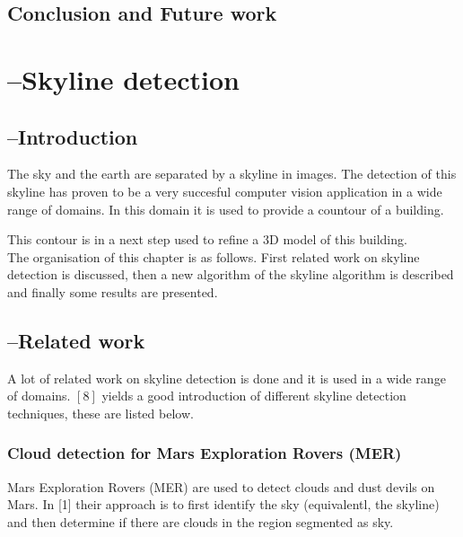 \subsection{Conclusion and Future work}





\section{--Skyline detection}
 \subsection{--Introduction}

The sky and the earth are separated by a skyline in images. The detection of this skyline
has proven to be a very succesful computer vision application in a wide range of
domains. In this domain it is used to provide a countour of a building. 

This
contour is in a next step used to refine a 3D model of this building.\\
The organisation of this chapter is as follows.  First related work on skyline
detection is discussed, then a new algorithm of the skyline algorithm is
described and finally some results are presented.\\
 \subsection{--Related work}
A lot of related work on skyline detection is done and it is used in a wide
range of domains. $[8]$ yields a good introduction of different skyline
detection techniques, these are listed below.

\subsubsection{Cloud detection for Mars Exploration Rovers (MER)}
Mars Exploration Rovers (MER) are used to detect clouds and dust devils on Mars.
In [1] their approach is to first identify the sky (equivalentl, the skyline)
and then determine if there are clouds in the region segmented as sky.

